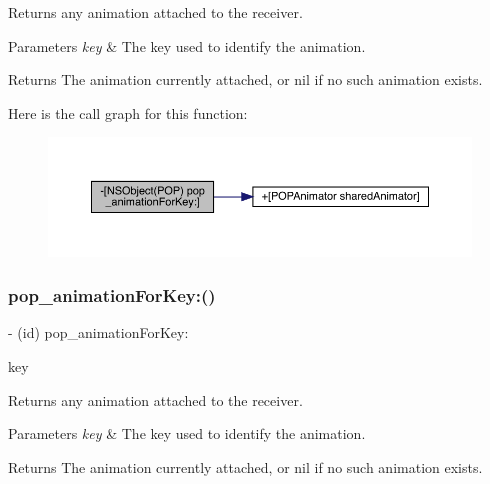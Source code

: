 Returns any animation attached to the receiver. 
\begin{DoxyParams}{Parameters}
{\em key} & The key used to identify the animation. \\
\hline
\end{DoxyParams}
\begin{DoxyReturn}{Returns}
The animation currently attached, or nil if no such animation exists. 
\end{DoxyReturn}
Here is the call graph for this function\+:\nopagebreak
\begin{figure}[H]
\begin{center}
\leavevmode
\includegraphics[width=350pt]{category_n_s_object_07_p_o_p_08_a517e269829d65c37f0541e49a3d18210_cgraph}
\end{center}
\end{figure}
\mbox{\label{category_n_s_object_07_p_o_p_08_a517e269829d65c37f0541e49a3d18210}} 
\subsubsection{\texorpdfstring{pop\+\_\+animation\+For\+Key\+:()}{pop\_animationForKey:()}\hspace{0.1cm}{\footnotesize\ttfamily [2/3]}}
{\footnotesize\ttfamily -\/ (id) pop\+\_\+animation\+For\+Key\+: \begin{DoxyParamCaption}\item[{(N\+S\+String $\ast$)}]{key }\end{DoxyParamCaption}}

Returns any animation attached to the receiver. 
\begin{DoxyParams}{Parameters}
{\em key} & The key used to identify the animation. \\
\hline
\end{DoxyParams}
\begin{DoxyReturn}{Returns}
The animation currently attached, or nil if no such animation exists. 
\end{DoxyReturn}
\mbox{\label{category_n_s_object_07_p_o_p_08_a517e269829d65c37f0541e49a3d18210}} 
